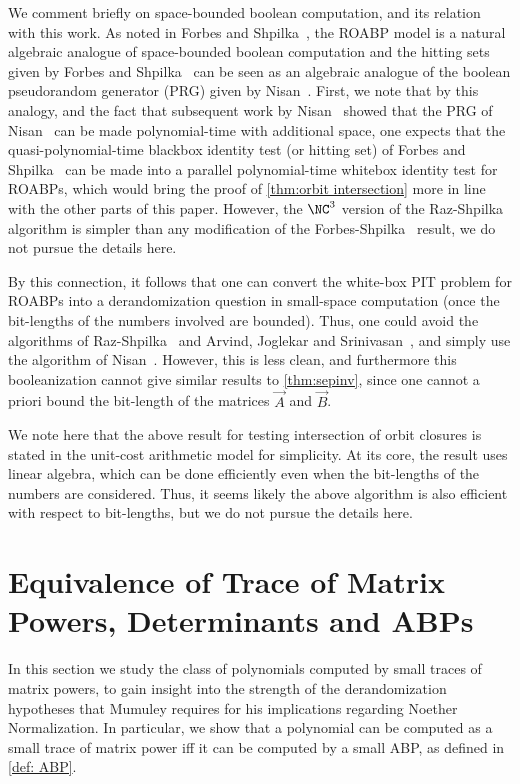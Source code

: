 \documentclass[letterpaper,11pt]{article}
\numberwithin{equation}{section}
\theoremstyle{plain}
\theoremstyle{remark}
\begin{document}
We comment briefly on space-bounded boolean computation, and its relation with this work.  As noted in Forbes and Shpilka~\cite{ForbesShpilka12a}, the ROABP model is a natural algebraic analogue of space-bounded boolean computation and the hitting sets given by Forbes and Shpilka~\cite{ForbesShpilka12a} can be seen as an algebraic analogue of the boolean pseudorandom generator (PRG) given by Nisan~\cite{Nisan92}.  First, we note that by this analogy, and the fact that subsequent work by Nisan~\cite{Nisan94} showed that the PRG of Nisan~\cite{Nisan92} can be made polynomial-time with additional space, one expects that the quasi-polynomial-time blackbox identity test (or hitting set) of Forbes and Shpilka~\cite{ForbesShpilka12a} can be made into a parallel polynomial-time whitebox identity test for ROABPs, which would bring the proof of \autoref{thm:orbit intersection} more in line with the other parts of this paper. However, the $\NC^3$ version of the Raz-Shpilka~\cite{RazShpilka05} algorithm is simpler than any modification of the Forbes-Shpilka~\cite{ForbesShpilka12a} result, we do not pursue the details here.

By this connection, it follows that one can convert the white-box PIT problem for ROABPs into a derandomization question in small-space computation (once the bit-lengths of the numbers involved are bounded).  Thus, one could avoid the algorithms of Raz-Shpilka~\cite{RazShpilka05} and Arvind, Joglekar and Srinivasan~\cite{ArvindJS09}, and simply use the algorithm of Nisan~\cite{Nisan94}.  However, this is less clean, and furthermore this booleanization cannot give similar results to \autoref{thm:sepinv}, since one cannot a priori bound the bit-length of the matrices $\vec{A}$ and $\vec{B}$.

We note here that the above result for testing intersection of orbit closures is stated in the unit-cost arithmetic model for simplicity.  At its core, the result uses linear algebra, which can be done efficiently even when the bit-lengths of the numbers are considered.  Thus, it seems likely the above algorithm is also efficient with respect to bit-lengths, but we do not pursue the details here.

\section{Equivalence of Trace of Matrix Powers, Determinants and ABPs}\label{sec:equivalent}

In this section we study the class of polynomials computed by small traces of matrix powers, to gain insight into the strength of the derandomization hypotheses that Mumuley requires for his implications regarding Noether Normalization.  In particular, we show that a polynomial can be computed as a small trace of matrix power iff it can be computed by a small ABP, as defined in \autoref{def: ABP}.
\end{document}
